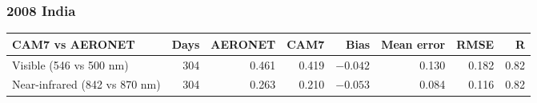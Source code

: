 \begin{frame}[t]
\frametitle{2008 India}
\centering
{}\hfill
{}\par
\vspace{0.15cm}
\hfill
{}\par
\vspace{0.1cm}
{\tiny\setlength{\tabcolsep}{5pt}
\begin{tabular}{@{}lrrrrrrr@{}}
\toprule
CAM7 vs AERONET & Days & AERONET & CAM7 & Bias & Mean error & RMSE & R \\
\midrule
Visible (546 vs 500 nm) & 304 & 0.461 & 0.419 & $-0.042$ & 0.130 & 0.182 & 0.82 \\
Near-infrared (842 vs 870 nm) & 304 & 0.263 & 0.210 & $-0.053$ & 0.084 & 0.116 & 0.82 \\
\bottomrule
\end{tabular}\par}
\end{frame}
